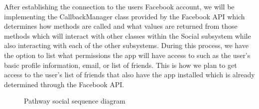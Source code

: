 ﻿\documentclass{article}
\begin{document}
After establishing the connection to the users Facebook account, we will be implementing the CallbackManager class provided by the Facebook API which determines how methods are called and what values are returned from those methods which will interact with other classes within the Social subsystem while also interacting with each of the other subsystems. During this process, we have the option to list what permissions the app will have access to such as the user's basic profile information, email, or list of friends. This is how we plan to get access to the user's list of friends that also have the app installed which is already determined through the Facebook API.

\begin{figure}[H]
      \centering
      \begin{center}
        \end{center}
      \caption{Pathway social sequence diagram}
      \label{fig:my_label}
  \end{figure}
\end{document}

